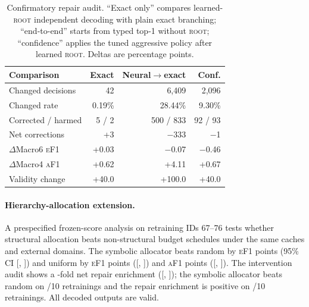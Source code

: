 \documentclass[11pt]{article}
\newcommand{\rootnode}{\textsc{root}}
\newcommand{\ef}{\textsc{eF1}}
\newcommand{\af}{\textsc{aF1}}
\begin{document}
\begin{table}[h]
\centering
\scriptsize
\setlength{\tabcolsep}{3pt}
\begin{tabular}{lrrr}
\toprule
Comparison & Exact & Neural$\to$exact & Conf.\\
\midrule
Changed decisions & 42 & 6,409 & 2,096\\
Changed rate & 0.19\% & 28.44\% & 9.30\%\\
Corrected / harmed & 5 / 2 & 500 / 833 & 92 / 93\\
Net corrections & +3 & $-$333 & $-$1\\
$\Delta$Macro6 \ef & +0.03 & $-$0.07 & $-$0.46\\
$\Delta$Macro4 \af & +0.62 & +4.11 & +0.67\\
Validity change & +40.0 & +100.0 & +40.0\\
\bottomrule
\end{tabular}
\caption{Confirmatory repair audit. ``Exact only'' compares learned-\rootnode{}
independent decoding with plain exact branching; ``end-to-end'' starts from
typed top-1 without \rootnode; ``confidence'' applies the tuned aggressive
policy after learned \rootnode. Deltas are percentage points.}
\label{tab:repair}
\end{table}

\paragraph{Hierarchy-allocation extension.}
A prespecified frozen-score analysis on retraining IDs 67--76 tests whether structural allocation
beats non-structural budget schedules under the same caches and external
domains. The symbolic allocator beats random by
\HierarchySymbolicMinusRandomEdge{} \ef{} points
(95\% CI [\HierarchySymbolicMinusRandomEdgeLow,
\HierarchySymbolicMinusRandomEdgeHigh]) and uniform by
\HierarchySymbolicMinusUniformEdge{} \ef{} points
([\HierarchySymbolicMinusUniformEdgeLow, \HierarchySymbolicMinusUniformEdgeHigh])
and \HierarchySymbolicMinusUniformAncestor{} \af{} points
([\HierarchySymbolicMinusUniformAncestorLow,
\HierarchySymbolicMinusUniformAncestorHigh]). The intervention audit shows a
\HierarchyNetRepairEnrichment{}-fold net repair enrichment
([\HierarchyNetRepairEnrichmentLow, \HierarchyNetRepairEnrichmentHigh]); the
symbolic allocator beats random on \HierarchySymbolicMinusRandomEdgeWins/10 retrainings
and the repair enrichment is positive on \HierarchyNetRepairEnrichmentWins/10
retrainings. All \HierarchyAuditValidOutputs{} decoded outputs are valid.
\end{document}
